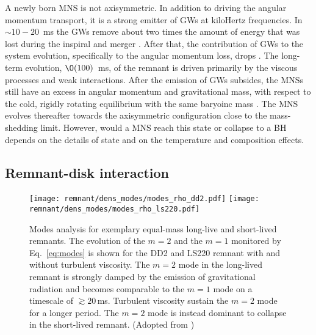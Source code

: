 
A newly born \ac{MNS} is not axisymmetric. In addition to driving the angular 
momentum transport, it is a strong emitter of \acp{GW} at kiloHertz frequencies.
In ${\sim}10-20$~ms \pmerg{} the \acp{GW} remove about two times the 
amount of energy that was lost during the inspiral and merger \citep{Bernuzzi:2015opx}.
%
After that, the contribution of \acp{GW} to the system evolution, specifically to the 
angular momentum loss, drops \citep{Radice:2018xqa}. The long-term evolution, $\O(100)$~ms,
of the remnant is driven primarily by the viscous processes and weak interactions.
%
After the emission of \acp{GW} subsides, the \acp{MNS} still have an excess 
in angular momentum and gravitational mass, with respect to the cold, 
rigidly rotating equilibrium with the same baryoinc mass \citep{Radice:2018xqa}.
%
The \ac{MNS} evolves thereafter towards the axisymmetric configuration 
close to the mass-shedding limit. However, would a \ac{MNS} reach this state 
or collapse to a \ac{BH} depends on the details of \pmerg{} 
state and on the temperature and composition effects.


\subsection{Remnant-disk interaction}\label{sec:bns_sims:remdisk}

\begin{figure*}[t]
    \centering 
    \texttt{[image: remnant/dens\_modes/modes\_rho\_dd2.pdf]}
    \texttt{[image: remnant/dens\_modes/modes\_rho\_ls220.pdf]}
    \caption{Modes analysis for exemplary equal-mass long-live and short-lived
        remnants. The evolution of the $m=2$ and the $m=1$ monitored by
        Eq.~\eqref{eq:modes} is shown for the DD2 and LS220 remnant with and
        without turbulent viscosity. The $m=2$ mode in the long-lived
        remnant is strongly damped by the emission of gravitational
        radiation and becomes comparable to the $m=1$ mode on a timescale of
        ${\gtrsim}20\,$ms. Turbulent viscosity sustain the $m=2$ mode for
        a longer period. The $m=2$ mode is instead dominant to collapse in
        the short-lived remnant.
        (Adopted from \cite{Nedora:2020pak})
    }
    \label{fig:dens_modes}
\end{figure*}

